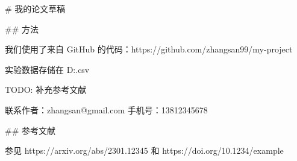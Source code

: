 # 我的论文草稿

\author{张三}

## 方法

我们使用了来自 GitHub 的代码：https://github.com/zhangsan99/my-project

实验数据存储在 D:\Users\zhangsan\Documents\data\experiment.csv

TODO: 补充参考文献

联系作者：zhangsan@gmail.com
手机号：13812345678

## 参考文献

参见 https://arxiv.org/abs/2301.12345 和 https://doi.org/10.1234/example
